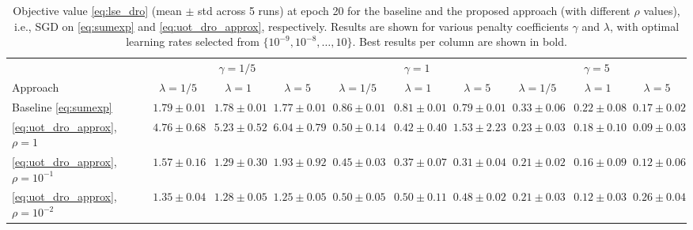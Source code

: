 \documentclass{article}
\theoremstyle{plain}
\theoremstyle{definition}
\theoremstyle{remark}
\begin{document}
\begin{table}[t]
\centering
\scriptsize
\setlength{\tabcolsep}{3pt}
\caption{Objective value \eqref{eq:lse_dro} (mean $\pm$ std across 5 runs) at epoch 20 for the baseline \citep{wang2024outlier} and the proposed approach (with different $\rho$ values), i.e., SGD on \eqref{eq:sumexp} and \eqref{eq:uot_dro_approx}, respectively. Results are shown for various penalty coefficients $\gamma$ and $\lambda$, with optimal learning rates selected from $\{10^{-9}, 10^{-8}, \dots, 10 \}$. Best results per column are shown in bold.}
\label{tab:results_2}
\begin{tabular}{l|ccc|ccc|ccc}
\toprule
  & \multicolumn{3}{c|}{$\gamma=1/5$} & \multicolumn{3}{c|}{$\gamma=1$} & \multicolumn{3}{c}{$\gamma=5$} \\
\cline{2-4} \cline{5-7} \cline{8-10}
Approach & $\lambda=1/5$ & $\lambda=1$ & $\lambda=5$ & $\lambda=1/5$ & $\lambda=1$ & $\lambda=5$ & $\lambda=1/5$ & $\lambda=1$ & $\lambda=5$ \\
\midrule
Baseline \eqref{eq:sumexp} & $1.79\!\pm\!0.01$ & $1.78\!\pm\!0.01$ & $1.77\!\pm\!0.01$ & $0.86\!\pm\!0.01$ & $0.81\!\pm\!0.01$ & $0.79\!\pm\!0.01$ & $0.33\!\pm\!0.06$ & $0.22\!\pm\!0.08$ & $0.17\!\pm\!0.02$ \\
\hline
\eqref{eq:uot_dro_approx}, $\rho\!=\!1$ & $4.76\!\pm\!0.68$ & $5.23\!\pm\!0.52$ & $6.04\!\pm\!0.79$ & $0.50\!\pm\!0.14$ & $0.42\!\pm\!0.40$ & $1.53\!\pm\!2.23$ & $0.23\!\pm\!0.03$ & $0.18\!\pm\!0.10$ & $\bm{0.09\!\pm\!0.03}$ \\
\hline
\eqref{eq:uot_dro_approx}, $\rho\!=\!10^{-1}$ & $1.57\!\pm\!0.16$ & $1.29\!\pm\!0.30$ & $1.93\!\pm\!0.92$ & $\bm{0.45\!\pm\!0.03}$ & $\bm{0.37\!\pm\!0.07}$ & $\bm{0.31\!\pm\!0.04}$ & $\bm{0.21\!\pm\!0.02}$ & $0.16\!\pm\!0.09$ & $0.12\!\pm\!0.06$ \\
\hline
\eqref{eq:uot_dro_approx}, $\rho\!=\!10^{-2}$ & $\bm{1.35\!\pm\!0.04}$ & $\bm{1.28\!\pm\!0.05}$ & $\bm{1.25\!\pm\!0.05}$ & $0.50\!\pm\!0.05$ & $0.50\!\pm\!0.11$ & $0.48\!\pm\!0.02$ & $\bm{0.21\!\pm\!0.03}$ & $\bm{0.12\!\pm\!0.03}$ & $0.26\!\pm\!0.04$ \\
\bottomrule
\end{tabular}
\end{table}
\end{document}
